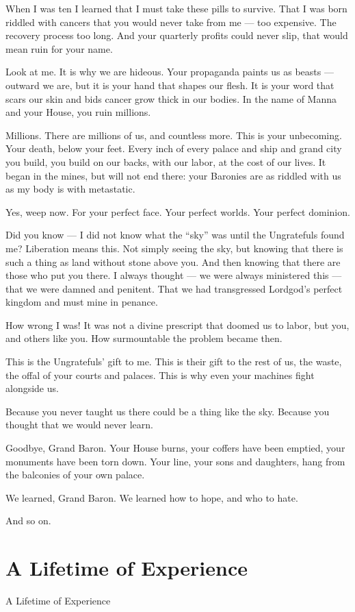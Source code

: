 When I was ten I learned that I must take these pills to survive. That I was born riddled with
cancers that you would never take from me — too expensive. The recovery process too long. And
your quarterly profits could never slip, that would mean ruin for your name.

Look at me. It is why we are hideous. Your propaganda paints us as beasts — outward we are,
but it is your hand that shapes our flesh. It is your word that scars our skin and bids cancer grow
thick in our bodies. In the name of Manna and your House, you ruin millions.

Millions. There are millions of us, and countless more. This is your unbecoming. Your death,
below your feet. Every inch of every palace and ship and grand city you build, you build on our
backs, with our labor, at the cost of our lives. It began in the mines, but will not end there: your
Baronies are as riddled with us as my body is with metastatic.




Yes, weep now. For your perfect face. Your perfect worlds. Your perfect dominion.

Did you know — I did not know what the “sky” was until the Ungratefuls found me? Liberation
means this. Not simply seeing the sky, but knowing that there is such a thing as land without
stone above you. And then knowing that there are those who put you there. I always thought —
we were always ministered this — that we were damned and penitent. That we had transgressed
Lordgod’s perfect kingdom and must mine in penance.

How wrong I was! It was not a divine prescript that doomed us to labor, but you, and others like
you. How surmountable the problem became then.

This is the Ungratefuls’ gift to me. This is their gift to the rest of us, the waste, the offal of your
courts and palaces. This is why even your machines fight alongside us.

Because you never taught us there could be a thing like the sky. Because you thought that we
would never learn.

Goodbye, Grand Baron. Your House burns, your coffers have been emptied, your monuments
have been torn down. Your line, your sons and daughters, hang from the balconies of your own
palace.

We learned, Grand Baron. We learned how to hope, and who to hate.

And so on.
\section{A Lifetime of Experience}
A Lifetime of Experience


